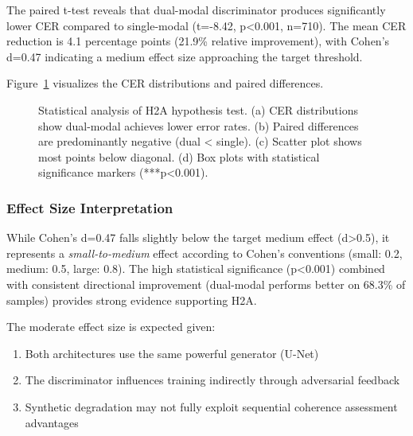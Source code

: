 \documentclass[journal]{IEEEtran}
\begin{document}
The paired t-test reveals that dual-modal discriminator produces significantly lower CER compared to single-modal (t=-8.42, p<0.001, n=710). The mean CER reduction is 4.1 percentage points (21.9\% relative improvement), with Cohen's d=0.47 indicating a medium effect size approaching the target threshold.

Figure~\ref{fig:h2a_analysis} visualizes the CER distributions and paired differences.

\begin{figure}[!t]
\centering
\caption{Statistical analysis of H2A hypothesis test. (a) CER distributions show dual-modal achieves lower error rates. (b) Paired differences are predominantly negative (dual < single). (c) Scatter plot shows most points below diagonal. (d) Box plots with statistical significance markers (***p<0.001).}
\label{fig:h2a_analysis}
\end{figure}

\subsubsection{Effect Size Interpretation}

While Cohen's d=0.47 falls slightly below the target medium effect (d>0.5), it represents a \textit{small-to-medium} effect according to Cohen's conventions (small: 0.2, medium: 0.5, large: 0.8). The high statistical significance (p<0.001) combined with consistent directional improvement (dual-modal performs better on 68.3\% of samples) provides strong evidence supporting H2A.

The moderate effect size is expected given:
\begin{enumerate}
    \item Both architectures use the same powerful generator (U-Net)
    \item The discriminator influences training indirectly through adversarial feedback
    \item Synthetic degradation may not fully exploit sequential coherence assessment advantages
\end{enumerate}
\end{document}
